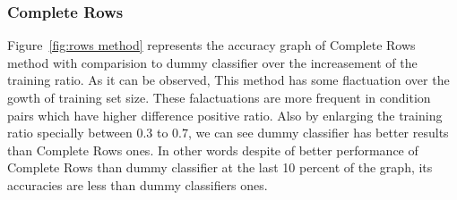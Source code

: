 \documentclass[10pt, conference, compsocconf]{IEEEtran}
\begin{document}
 


\subsubsection{Complete Rows}
Figure~\ref{fig:rows method} represents
the accuracy graph of Complete Rows method with comparision to dummy
classifier over the increasement of the training ratio.
As it can be observed, This method has some flactuation over the gowth of training set size. These falactuations are more frequent in condition pairs which have higher difference positive ratio. Also by enlarging the training ratio specially between $0.3$ to $0.7$, we can see dummy classifier has better results than Complete Rows ones. In other words despite of better performance of Complete Rows than dummy classifier at the last 10 percent of the graph, its accuracies are less than dummy classifiers ones.  
\end{document}
